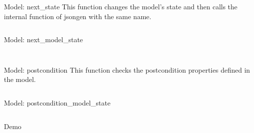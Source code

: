 \begin{frame}{Model: next\_state}
  This function changes the model's state and then calls the internal
  function of jsongen with the same name.

  \inputminted{erlang}{./code/next_state.erl}
\end{frame}

\begin{frame}{Model: next\_model\_state}
  \inputminted{erlang}{./code/next_model_state.erl}
\end{frame}

\begin{frame}
  \inputminted{erlang}{./code/next_model_state1.erl}
\end{frame}

\begin{frame}{Model: postcondition}
  This function checks the postcondition properties defined in the
  model.

  \inputminted{erlang}{./code/postcondition.erl}
\end{frame}

\begin{frame}{Model: postcondition\_model\_state}
  \inputminted{erlang}{./code/postcondition_model_state.erl}
\end{frame}

\begin{frame}[standout]
  Demo
\end{frame}